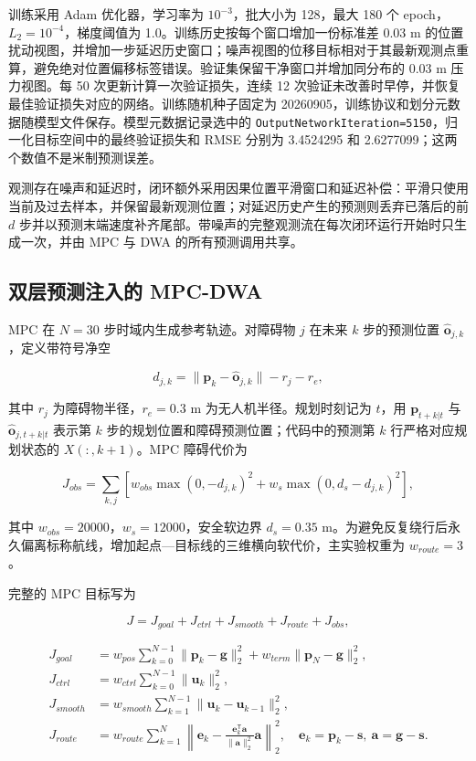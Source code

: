 \documentclass[11pt,a4paper]{ctexart}
\begin{document}
训练采用 Adam 优化器，学习率为 $10^{-3}$，批大小为 128，最大 180 个 epoch，$L_2=10^{-4}$，梯度阈值为 1.0。训练历史按每个窗口增加一份标准差 0.03 m 的位置扰动视图，并增加一步延迟历史窗口；噪声视图的位移目标相对于其最新观测点重算，避免绝对位置偏移标签错误。验证集保留干净窗口并增加同分布的 0.03 m 压力视图。每 50 次更新计算一次验证损失，连续 12 次验证未改善时早停，并恢复最佳验证损失对应的网络。训练随机种子固定为 20260905，训练协议和划分元数据随模型文件保存。模型元数据记录选中的 \texttt{OutputNetworkIteration=5150}，归一化目标空间中的最终验证损失和 RMSE 分别为 3.4524295 和 2.6277099；这两个数值不是米制预测误差。

观测存在噪声和延迟时，闭环额外采用因果位置平滑窗口和延迟补偿：平滑只使用当前及过去样本，并保留最新观测位置；对延迟历史产生的预测则丢弃已落后的前 $d$ 步并以预测末端速度补齐尾部。带噪声的完整观测流在每次闭环运行开始时只生成一次，并由 MPC 与 DWA 的所有预测调用共享。

\subsection{双层预测注入的 MPC-DWA}

MPC 在 $N=30$ 步时域内生成参考轨迹。对障碍物 $j$ 在未来 $k$ 步的预测位置 $\hat{\mathbf{o}}_{j,k}$，定义带符号净空

\[
d_{j,k}=\|\mathbf{p}_k-\hat{\mathbf{o}}_{j,k}\|-r_j-r_e,
\]

其中 $r_j$ 为障碍物半径，$r_e=0.3$ m 为无人机半径。规划时刻记为 $t$，用 $\mathbf{p}_{t+k|t}$ 与 $\hat{\mathbf{o}}_{j,t+k|t}$ 表示第 $k$ 步的规划位置和障碍预测位置；代码中的预测第 $k$ 行严格对应规划状态的 $X(:,k+1)$。MPC 障碍代价为

\[
J_{obs}=\sum_{k,j}\left[w_{obs}\max(0,-d_{j,k})^2
+w_s\max(0,d_s-d_{j,k})^2\right],
\]

其中 $w_{obs}=20000$，$w_s=12000$，安全软边界 $d_s=0.35$ m。为避免反复绕行后永久偏离标称航线，增加起点—目标线的三维横向软代价，主实验权重为 $w_{route}=3$。

完整的 MPC 目标写为

\[
J=J_{goal}+J_{ctrl}+J_{smooth}+J_{route}+J_{obs},
\]

\[
\begin{aligned}
J_{goal}&=w_{pos}\sum_{k=0}^{N-1}\|\mathbf p_k-\mathbf g\|_2^2+w_{term}\|\mathbf p_N-\mathbf g\|_2^2,\\
J_{ctrl}&=w_{ctrl}\sum_{k=0}^{N-1}\|\mathbf u_k\|_2^2,\\
J_{smooth}&=w_{smooth}\sum_{k=1}^{N-1}\|\mathbf u_k-\mathbf u_{k-1}\|_2^2,\\
J_{route}&=w_{route}\sum_{k=1}^{N}\left\|\mathbf e_k-\frac{\mathbf e_k^{\mathsf T}\mathbf a}{\|\mathbf a\|_2^2}\mathbf a\right\|_2^2,
\quad \mathbf e_k=\mathbf p_k-\mathbf s,\ \mathbf a=\mathbf g-\mathbf s.
\end{aligned}
\]
\end{document}
